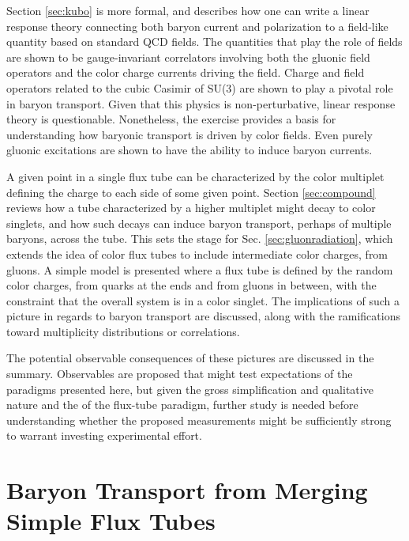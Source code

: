 \documentclass[aps, prc, 12pt, nofootinbib, showpacs, superscriptaddress, tightenlines, groupedaddress]{revtex4-2}
\begin{document}
Section \ref{sec:kubo} is more formal, and describes how one can write a linear response theory connecting both baryon current and polarization to a field-like quantity based on standard QCD fields. The quantities that play the role of fields are shown to be gauge-invariant correlators involving both the gluonic field operators and the color charge currents driving the field. Charge and field operators related to the cubic Casimir of SU(3) are shown to play a pivotal role in baryon transport. Given that this physics is non-perturbative, linear response theory is questionable. Nonetheless, the exercise provides a basis for understanding how baryonic transport is driven by color fields. Even purely gluonic excitations are shown to have the ability to induce baryon currents.

A given point in a single flux tube can be characterized by the color multiplet defining the charge to each side of some given point. Section \ref{sec:compound} reviews how a tube characterized by a higher multiplet might decay to color singlets, and how such decays can induce baryon transport, perhaps of multiple baryons, across the tube. This sets the stage for Sec. \ref{sec:gluonradiation}, which extends the idea of color flux tubes to include intermediate color charges, from gluons. A simple model is presented where a flux tube is defined by the random color charges, from quarks at the ends and from gluons in between, with the constraint that the overall system is in a color singlet. The implications of such a picture in regards to baryon transport are discussed, along with the ramifications toward multiplicity distributions or correlations.

The potential observable consequences of these pictures are discussed in the summary. Observables are proposed that might test expectations of the paradigms presented here, but given the gross simplification and qualitative nature and the of the flux-tube paradigm, further study is needed before understanding whether the proposed measurements  might be sufficiently strong to warrant investing experimental effort. 

\section{Baryon Transport from Merging Simple Flux Tubes}\label{sec:simple}
\end{document}
